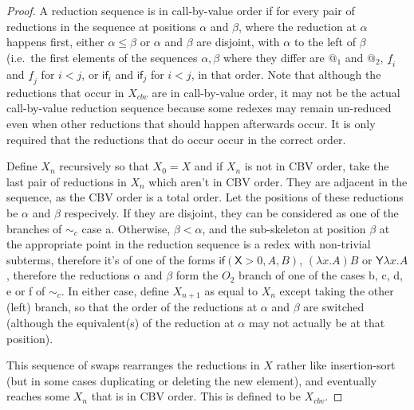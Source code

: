 \documentclass{article}
\newcommand{\tY}{\mathsf{Y}}
\newcommand{\tif}[3]{\mathsf{if}(#1, #2, #3)} %
\newcommand{\skeletonPlaceholder}{\mathsf{X}} %
\theoremstyle{definition}
\theoremstyle{lemma}
\theoremstyle{remark}
\begin{document}
\begin{proof}
A reduction sequence is in call-by-value order if for every pair of reductions in the sequence at positions $\alpha$ and $\beta$, where the reduction at $\alpha$ happens first, either $\alpha \leq \beta$ or $\alpha$ and $\beta$ are disjoint, with $\alpha$ to the left of $\beta$ (i.e.~the first elements of the sequences $\alpha, \beta$ where they differ are $@_1$ and $@_2$, $\underline f_i$ and $\underline f_j$ for $i < j$, or $\textsf{if}_i$ and $\textsf{if}_j$ for $i < j$, in that order. Note that although the reductions that occur in $X_{cbv}$ are in call-by-value order, it may not be the actual call-by-value reduction sequence because some redexes may remain un-reduced even when other reductions that should happen afterwards occur. It is only required that the reductions that do occur occur in the correct order.
\iffalse
\lo{So this is permitted?
\[
(II)(I (I \bar I)) \to
(II)(I\bar I) \to
(II)\bar I 
\]
but not this: 
\(
(II)(I (I \bar I)) \to
(II)(I \bar I) \to
(II)\bar I 
\)?}
\fi

Define $X_n$ recursively so that $X_0 = X$ and if $X_n$ is not in CBV order, take the last pair of reductions in $X_n$ which aren't in CBV order. They are adjacent in the sequence, as the CBV order is a total order. Let the positions of these reductions be $\alpha$ and $\beta$ respecively. If they are disjoint, they can be considered as one of the branches of $\sim_c$ case a. Otherwise, $\beta < \alpha$, and the sub-skeleton at position $\beta$ at the appropriate point in the reduction sequence is a redex with non-trivial subterms, therefore it's of one of the forms $\tif{\skeletonPlaceholder>0}{A}{B}$, $(\lambda x.A) B$ or $\tY \lambda x. A$, therefore the reductions $\alpha$ and $\beta$ form the $O_2$ branch of one of the cases b, c, d, e or f of $\sim_c$. In either case, define $X_{n+1}$ as equal to $X_n$ except taking the other (left) branch, so that the order of the reductions at $\alpha$ and $\beta$ are switched (although the equivalent(s) of the reduction at $\alpha$ may not actually be at that position).

This sequence of swaps rearranges the reductions in $X$ rather like insertion-sort (but in some cases duplicating or deleting the new element), and eventually reaches some $X_n$ that is in CBV order. This is defined to be $X_{cbv}$.


\end{proof}
\end{document}
